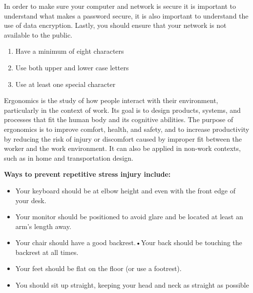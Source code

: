\documentclass{report}
\begin{document}
    In order to make sure your computer and network is secure it is important to understand 
    what makes a password secure, it is also important to understand the use of data encryption. 
    Lastly, you should ensure that your network is not available to the public.
    \bigbreak \noindent

    \begin{enumerate}
        \item Have a minimum of eight characters 
        \item Use both upper and lower case letters
        \item Use at least one special character
    \end{enumerate}
    \bigbreak \noindent

    Ergonomics is the study of how people interact with their environment, 
    particularly in the context of work. Its goal is to design products, systems, and 
    processes that fit the human body and its cognitive abilities. The purpose of ergonomics 
    is to improve comfort, health, and safety, and to increase productivity by reducing the 
    risk of injury or discomfort caused by improper fit between the worker and the work 
    environment. It can also be applied in non-work contexts, such as in home and 
    transportation design.

    \bigbreak \noindent 

    \noindent \textbf{Ways to prevent repetitive stress injury include:}
    \begin{itemize}
        \item Your keyboard should be at elbow height and even with the front edge of your desk.
        \item Your monitor should be positioned to avoid glare and be located at least an arm’s length away.
        \item Your chair should have a good backrest.•Your back should be touching the backrest at all times.
        \item Your feet should be flat on the floor (or use a footrest).
        \item You should sit up straight, keeping your head and neck as straight as possible
    \end{itemize}
\end{document}
